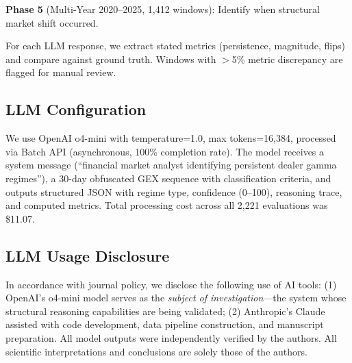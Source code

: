\textbf{Phase 5} (Multi-Year 2020--2025, 1,412 windows): Identify when structural market shift occurred.

For each LLM response, we extract stated metrics (persistence, magnitude, flips) and compare against ground truth. Windows with $>$5\% metric discrepancy are flagged for manual review.

\subsection{LLM Configuration}

We use OpenAI o4-mini \citep{openai2024reasoning} with temperature=1.0, max tokens=16,384, processed via Batch API (asynchronous, 100\% completion rate). The model receives a system message (``financial market analyst identifying persistent dealer gamma regimes''), a 30-day obfuscated GEX sequence with classification criteria, and outputs structured JSON with regime type, confidence (0--100), reasoning trace, and computed metrics. Total processing cost across all 2,221 evaluations was \$11.07.

\subsection{LLM Usage Disclosure}

In accordance with journal policy, we disclose the following use of AI tools: (1) OpenAI's o4-mini model serves as the \textit{subject of investigation}---the system whose structural reasoning capabilities are being validated; (2) Anthropic's Claude assisted with code development, data pipeline construction, and manuscript preparation. All model outputs were independently verified by the authors. All scientific interpretations and conclusions are solely those of the authors.
